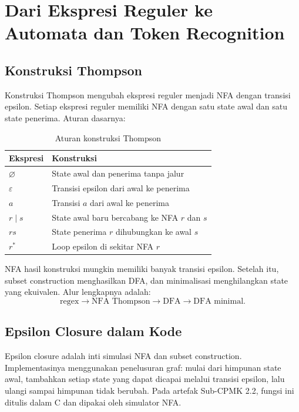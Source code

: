 \section{Dari Ekspresi Reguler ke Automata dan Token Recognition}
\label{sec:ch06-thompson}

\subsection{Konstruksi Thompson}

Konstruksi Thompson mengubah ekspresi reguler menjadi NFA dengan
transisi epsilon. Setiap ekspresi reguler memiliki NFA dengan satu
state awal dan satu state penerima. Aturan dasarnya:
\begin{table}[H]
\centering
\caption{Aturan konstruksi Thompson}
\label{tab:ch06-thompson}
\begin{tabularx}{\textwidth}{@{}l X@{}}
\toprule
\textbf{Ekspresi} & \textbf{Konstruksi} \\
\midrule
\(\varnothing\) & State awal dan penerima tanpa jalur \\
\(\varepsilon\) & Transisi epsilon dari awal ke penerima \\
\(a\) & Transisi \(a\) dari awal ke penerima \\
\(r \mid s\) & State awal baru bercabang ke NFA \(r\) dan \(s\) \\
\(rs\) & State penerima \(r\) dihubungkan ke awal \(s\) \\
\(r^{*}\) & Loop epsilon di sekitar NFA \(r\) \\
\bottomrule
\end{tabularx}
\end{table}

NFA hasil konstruksi mungkin memiliki banyak transisi epsilon. Setelah
itu, subset construction menghasilkan DFA, dan minimalisasi
menghilangkan state yang ekuivalen. Alur lengkapnya adalah:
\[
\text{regex} \to \text{NFA Thompson} \to \text{DFA} \to
\text{DFA minimal}.
\]

\subsection{Epsilon Closure dalam Kode}

Epsilon closure adalah inti simulasi NFA dan subset construction.
Implementasinya menggunakan penelusuran graf: mulai dari himpunan
state awal, tambahkan setiap state yang dapat dicapai melalui
transisi epsilon, lalu ulangi sampai himpunan tidak berubah. Pada
artefak Sub-CPMK 2.2, fungsi ini ditulis dalam C dan dipakai oleh
simulator NFA.


